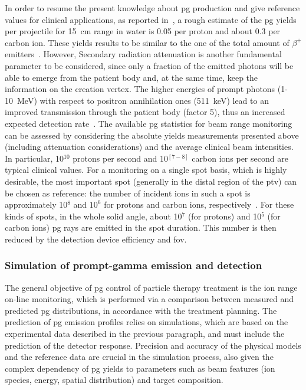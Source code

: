 In order to resume the present knowledge about \gls{pg} production and give reference values for clinical applications, as reported in~\cite{Krimmer2017}, a rough estimate of the \gls{pg} yields per projectile for 15~cm range in water is 0.05 per proton and about 0.3 per carbon ion. These yields results to be similar to the one of the total amount of $\beta^{+}$ emitters~\parencite{Pinto2015, Robert2013}. However, Secondary radiation attenuation is another fundamental parameter to be considered, since only a fraction of the emitted photons will be able to emerge from the patient body and, at the same time, keep the information on the creation vertex. The higher energies of prompt photons (1-10~MeV) with respect to positron annihilation ones (511~keV) lead to an improved transmission through the patient body (factor 5), thus an increased expected detection rate~\parencite{Moteabbed2011}. 
The available \gls{pg} statistics for beam range monitoring can be assessed by considering the absolute yields measurements presented above (including attenuation considerations) and the average clinical beam intensities. In particular, 10$^{10}$ protons per second and 10$^{[7-8]}$ carbon ions per second are typical clinical values. For a monitoring on a single spot basis, which is highly desirable, the most important spot (generally in the distal region of the \gls{ptv}) can be chosen as reference: the number of incident ions in such a spot is approximately 10$^8$ and $10^6$ for protons and carbon ions, respectively~\parencite{Kramer2000, Grevillot2012}. For these kinds of spots, in the whole solid angle, about 10$^7$ (for protons) and 10$^5$ (for carbon ions) \gls{pg} rays are emitted in the spot duration. This number is then reduced by the detection device efficiency and \gls{fov}. 

\subsubsection{Simulation of prompt-gamma emission and detection}\label{chap2::subsec::PGsimulation}

The general objective of \gls{pg} control of particle therapy treatment is the ion range on-line monitoring, which is performed via a comparison between measured and predicted \gls{pg} distributions, in accordance with the treatment planning. The prediction of \gls{pg} emission profiles relies on simulations, which are based on the experimental data described in the previous paragraph, and must include the prediction of the detector response. Precision and accuracy of the physical models and the reference data are crucial in the simulation process, also given the complex dependency of \gls{pg} yields to parameters such as beam features (ion species, energy, spatial distribution) and target composition. 

